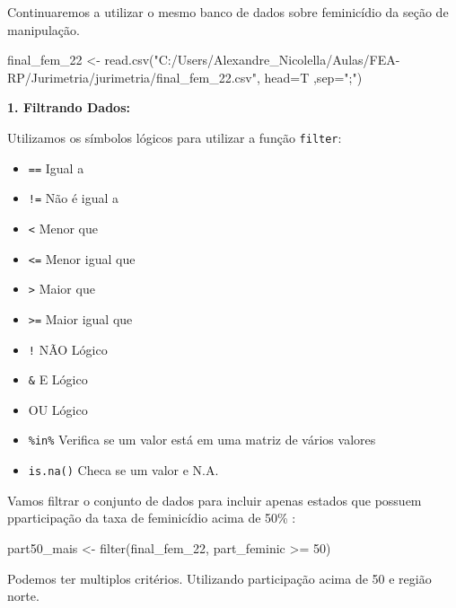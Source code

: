 \documentclass[
  letterpaper,
  DIV=11,
  numbers=noendperiod]{scrreprt}
\newenvironment{Shaded}{\begin{snugshade}}{\end{snugshade}}
\newcommand{\AttributeTok}[1]{\textcolor[rgb]{0.40,0.45,0.13}{#1}}
\newcommand{\DecValTok}[1]{\textcolor[rgb]{0.68,0.00,0.00}{#1}}
\newcommand{\FunctionTok}[1]{\textcolor[rgb]{0.28,0.35,0.67}{#1}}
\newcommand{\NormalTok}[1]{\textcolor[rgb]{0.00,0.23,0.31}{#1}}
\newcommand{\OtherTok}[1]{\textcolor[rgb]{0.00,0.23,0.31}{#1}}
\newcommand{\SpecialCharTok}[1]{\textcolor[rgb]{0.37,0.37,0.37}{#1}}
\newcommand{\StringTok}[1]{\textcolor[rgb]{0.13,0.47,0.30}{#1}}
\providecommand{\tightlist}{%
  \setlength{\itemsep}{0pt}\setlength{\parskip}{0pt}}
\begin{document}
Continuaremos a utilizar o mesmo banco de dados sobre feminicídio da
seção de manipulação.

\begin{Shaded}
\begin{Highlighting}[]
\NormalTok{final\_fem\_22 }\OtherTok{\textless{}{-}} \FunctionTok{read.csv}\NormalTok{(}\StringTok{"C:/Users/Alexandre\_Nicolella/Aulas/FEA{-}RP/Jurimetria/jurimetria/final\_fem\_22.csv"}\NormalTok{, }\AttributeTok{head=}\NormalTok{T ,}\AttributeTok{sep=}\StringTok{";"}\NormalTok{)}
\end{Highlighting}
\end{Shaded}

\textbf{1. Filtrando Dados:}

Utilizamos os símbolos lógicos para utilizar a função \texttt{filter}:

\begin{itemize}
\tightlist
\item
  \texttt{==} Igual a
\item
  \texttt{!=} Não é igual a
\item
  \texttt{\textless{}} Menor que
\item
  \texttt{\textless{}=} Menor igual que
\item
  \texttt{\textgreater{}} Maior que
\item
  \texttt{\textgreater{}=} Maior igual que
\item
  \texttt{!} NÃO Lógico
\item
  \texttt{\&} E Lógico
\item
  \texttt{\textbar{}} OU Lógico
\item
  \texttt{\%in\%} Verifica se um valor está em uma matriz de vários
  valores
\item
  \texttt{is.na()} Checa se um valor e N.A.
\end{itemize}

Vamos filtrar o conjunto de dados para incluir apenas estados que
possuem pparticipação da taxa de feminicídio acima de 50\% :

\begin{Shaded}
\begin{Highlighting}[]
\NormalTok{part50\_mais }\OtherTok{\textless{}{-}} \FunctionTok{filter}\NormalTok{(final\_fem\_22, part\_feminic }\SpecialCharTok{\textgreater{}=} \DecValTok{50}\NormalTok{)}
\end{Highlighting}
\end{Shaded}

Podemos ter multiplos critérios. Utilizando participação acima de 50 e
região norte.
\end{document}
